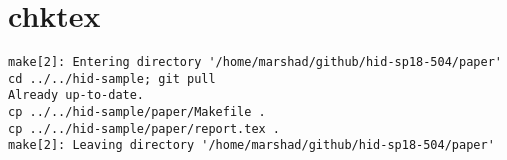 \appendix
\section{chktex}
\begin{tiny}
\begin{verbatim}
make[2]: Entering directory '/home/marshad/github/hid-sp18-504/paper'
cd ../../hid-sample; git pull
Already up-to-date.
cp ../../hid-sample/paper/Makefile .
cp ../../hid-sample/paper/report.tex .
make[2]: Leaving directory '/home/marshad/github/hid-sp18-504/paper'
\end{verbatim}
\end{tiny}
